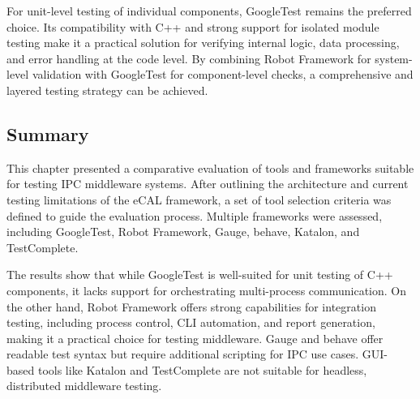 \vspace{2em}
For unit-level testing of individual components, GoogleTest remains the preferred choice. Its compatibility with C++ and strong support for isolated module testing make it a practical solution for verifying internal logic, data processing, and error handling at the code level. By combining Robot Framework for system-level validation with GoogleTest for component-level checks, a comprehensive and layered testing strategy can be achieved.

\subsection{Summary}

This chapter presented a comparative evaluation of tools and frameworks suitable for testing IPC middleware systems. After outlining the architecture and current testing limitations of the eCAL framework, a set of tool selection criteria was defined to guide the evaluation process. Multiple frameworks were assessed, including GoogleTest, Robot Framework, Gauge, behave, Katalon, and TestComplete.

\vspace{0.5em}
The results show that while GoogleTest is well-suited for unit testing of C++ components, it lacks support for orchestrating multi-process communication. On the other hand, Robot Framework offers strong capabilities for integration testing, including process control, CLI automation, and report generation, making it a practical choice for testing middleware. Gauge and behave offer readable test syntax but require additional scripting for IPC use cases. GUI-based tools like Katalon and TestComplete are not suitable for headless, distributed middleware testing.

